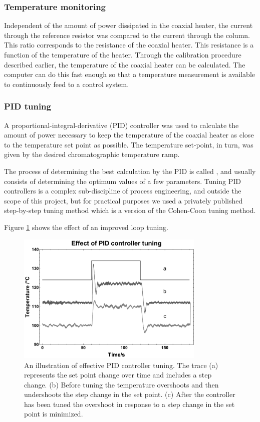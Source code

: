 \subsubsection{Temperature monitoring}

Independent of the amount of power dissipated in the coaxial heater, the current
through the reference resistor was compared to the current through the column.
This ratio corresponds to the resistance of the coaxial heater. This resistance
is a function of the temperature of the heater. Through the calibration
procedure described earlier, the temperature of the coaxial heater can be
calculated. The computer can do this fast enough so that a temperature
measurement is available to continuously feed to a control system. 

\subsubsection{PID tuning}

A proportional-integral-derivative (PID) controller was used to calculate the
amount of power necessary to keep the temperature of the coaxial heater as close
to the temperature set point as possible. The temperature set-point, in turn,
was given by the desired chromatographic temperature ramp.

The process of determining the best calculation by the PID is called
, and usually consists of determining the optimum values of a few
parameters. Tuning PID controllers is a complex sub-discipline of process
engineering, and outside the scope of this project, but for practical purposes
we used a privately published step-by-step tuning method \autocite{Peacock2008}
which is a version of the Cohen-Coon tuning method.

Figure \ref{fig:LoopTuning} shows the effect of an improved loop tuning. 

\begin{figure}
	\centering
	\includegraphics[width=0.8\textwidth]{Figures/LoopTuningGraph.pdf}
	\decoRule	
	\caption[Effect of controller tuning]{An illustration of effective PID
	controller tuning. The trace (a) represents the set point change over time and
	includes a step change. (b) Before tuning the temperature overshoots and then
	undershoots the step change in the set point. (c) After the controller has been
	tuned the overshoot in response to a step change in the set point is minimized. }
	\label{fig:LoopTuning} 
\end{figure}

